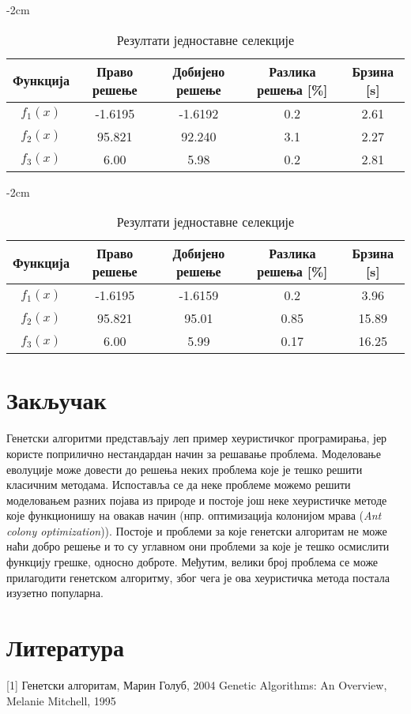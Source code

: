 \documentclass{article}
\begin{document}
\begin{table}[H]
    \centering
    \addtolength{\leftskip} {-2cm}
    \addtolength{\rightskip}{-2cm}
    \begin{tabular}{ |c|c|c|c|c| } 
        \hline
        \textbf{Функција} & \textbf{Право решење} & \textbf{Добијено решење} & \textbf{Разлика решења [\%]} & \textbf{Брзина [s]} \\ 
        \hline
        $f_1(x)$ & -1.6195 & -1.6192 & 0.2 & 2.61 \\ 
        \hline                     
        $f_2(x)$ & 95.821 & 92.240 & 3.1 & 2.27 \\ 
        \hline                     
        $f_3(x)$ & 6.00 & 5.98 & 0.2 & 2.81 \\ 
        \hline                     
    \end{tabular}
    \caption{Резултати једноставне селекције}
\end{table}

\begin{table}[H]
    \centering
    \addtolength{\leftskip} {-2cm}
    \addtolength{\rightskip}{-2cm}
    \begin{tabular}{ |c|c|c|c|c| } 
        \hline
        \textbf{Функција} & \textbf{Право решење} & \textbf{Добијено решење} & \textbf{Разлика решења [\%]} & \textbf{Брзина [s]} \\ 
        \hline
        $f_1(x)$ & -1.6195 & -1.6159 & 0.2 & 3.96 \\ 
        \hline                     
        $f_2(x)$ & 95.821 & 95.01 & 0.85 & 15.89 \\ 
        \hline                     
        $f_3(x)$ & 6.00 & 5.99 & 0.17 & 16.25 \\ 
        \hline                     
    \end{tabular}
    \caption{Резултати једноставне селекције}
\end{table}

\section{Закључак}
Генетски алгоритми представљају леп пример хеуристичког програмирања, јер користе поприлично
нестандардан начин за решавање проблема. Моделовање еволуције може довести до решења неких проблема 
које је тешко решити класичним методама. Испоставља се да неке проблеме можемо решити моделовањем 
разних појава из природе и постоје још неке хеуристичке методе које функционишу на овакав начин
(нпр. оптимизација колонијом мрава (\textit{Ant colony optimization})). Постоје и проблеми за које
генетски алгоритам не може наћи добро решење и то су углавном они проблеми за које је тешко осмислити 
функцију грешке, односно доброте. Међутим, велики број проблема се може прилагодити генетском
алгоритму, због чега је ова хеуристичка метода постала изузетно популарна.


\section{Литература}
[1] Генетски алгоритам, Марин Голуб, 2004 \newline
[2] Genetic Algorithms: An Overview, Melanie Mitchell, 1995 \newline
[3]
\end{document}
